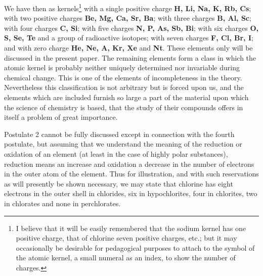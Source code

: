 \documentclass[11pt]{memoir}
\begin{document}
We have then as kernels\footnote{I believe that it will be easily remembered that the sodium kernel has one positive charge, that of chlorine seven positive charges, etc.; but it may occasionally be desirable for pedagogical purposes to attach to the symbol of the atomic kernel, a small numeral as an index, to show the number of charges.} with a single positive charge \textbf{H, Li, Na, K, Rb, Cs}; with two positive charges \textbf{Be, Mg, Ca, Sr, Ba}; with three charges \textbf{B, Al, Sc}; with four charges \textbf{C, Si}; with five charges \textbf{N, P, As, Sb, Bi}; with six charges \textbf{O, S, Se, Te} and a group of radioactive isotopes; with seven charges \textbf{F, Cl, Br, I}; and with zero charge \textbf{He, Ne, A, Kr, Xe} and \textbf{Nt}.  These elements only will be discussed in the present paper.  The remaining elements form a class in which the atomic kernel is probably neither uniquely determined nor invariable during chemical change.  This is one of the elements of incompleteness in the theory.  Nevertheless this classification is not arbitrary but is forced upon us, and the elements which are included furnish so large a part of the material upon which the science of chemistry is based, that the study of their compounds offers in itself a problem of great importance.

Postulate 2 cannot be fully discussed except in connection with the fourth postulate, but assuming that we understand the meaning of the reduction or oxidation of an element (at least in the case of highly polar substances), reduction means an increase and oxidation a decrease in the number of electrons in the outer atom of the element.  Thus for illustration, and with such reservations as will presently be shown necessary, we may state that chlorine has eight electrons in the outer shell in chlorides, six in hypochlorites, four in chlorites, two in chlorates and none in perchlorates.
\end{document}
